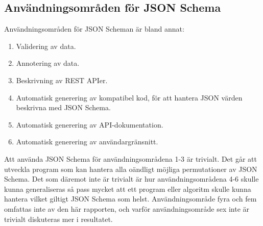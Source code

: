 \subsection{Användningsområden för JSON Schema}
Användningsområden för JSON Scheman är bland annat:

\begin{enumerate}
	\item Validering av data.
	\item Annotering av data.
	\item Beskrivning av REST APIer.
	\item Automatisk generering av kompatibel kod, för att hantera JSON värden beskrivna med JSON Schema.
	\item Automatisk generering av API-dokumentation.
	\item Automatisk generering av användargränsnitt.
\end{enumerate}

\noindent
Att använda JSON Schema för användningsområdena 1-3 är trivialt. Det går att utveckla program som kan hantera alla oändligt möjliga permutationer av JSON Schema. Det som däremot inte är trivialt är hur användningsområdena 4-6 skulle kunna generaliseras så pass mycket att ett program eller algoritm skulle kunna hantera vilket giltigt JSON Schema som helst. Användningsområde fyra och fem omfattas inte av den här rapporten, och varför användningsområde sex inte är trivialt diskuteras mer i resultatet.
